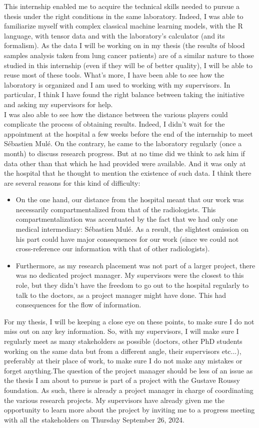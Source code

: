 \documentclass[preprint,12pt]{elsarticle}
\begin{document}
\noindent This internship enabled me to acquire the technical skills needed to pursue a thesis under the right conditions in the same laboratory. Indeed, I was able to familiarize myself with complex classical machine learning models, with the R language, with tensor data and with the laboratory's calculator (and its formalism). As the data I will be working on in my thesis (the results of blood samples analysis taken from lung cancer patients) are of a similar nature to those studied in this internship (even if they will be of better quality), I will be able to reuse most of these tools. What's more, I have been able to see how the laboratory is organized and I am used to working with my supervisors. In particular, I think I have found the right balance between taking the initiative and asking my supervisors for help.\\
\indent I was also able to see how the distance between the various players could complicate the process of obtaining results. Indeed, I didn't wait for the appointment at the hospital a few weeks before the end of the internship to meet Sébastien Mulé. On the contrary, he came to the laboratory regularly (once a month) to discuss research progress. But at no time did we think to ask him if data other than that which he had provided were available. And it was only at the hospital that he thought to mention the existence of such data. I think there are several reasons for this kind of difficulty:
\begin{itemize}[label = $\bullet$]
    \item On the one hand, our distance from the hospital meant that our work was necessarily compartmentalized from that of the radiologists. This compartmentalization was accentuated by the fact that we had only one medical intermediary: Sébastien Mulé. As a result, the slightest omission on his part could have major consequences for our work (since we could not cross-reference our information with that of other radiologists).
    \item Furthermore, as my research placement was not part of a larger project, there was no dedicated project manager. My supervisors were the closest to this role, but they didn't have the freedom to go out to the hospital regularly to talk to the doctors, as a project manager might have done. This had consequences for the flow of information.
\end{itemize}
\indent For my thesis, I will be keeping a close eye on these points, to make sure I do not miss out on any key information. So, with my supervisors, I will make sure I regularly meet as many stakeholders as possible (doctors, other PhD students working on the same data but from a different angle, their supervisors etc...), preferably at their place of work, to make sure I do not make any mistakes or forget anything.The question of the project manager should be less of an issue as the thesis I am about to pursue is part of a project with the Gustave Roussy foundation. As such, there is already a project manager in charge of coordinating the various research projects. My supervisors have already given me the opportunity to learn more about the project by inviting me to a progress meeting with all the stakeholders on Thursday September 26, 2024. \\
\end{document}
